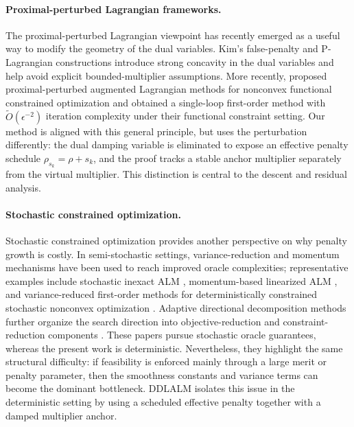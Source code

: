 \paragraph{Proximal-perturbed Lagrangian frameworks.}
The proximal-perturbed Lagrangian viewpoint has recently emerged as a useful
way to modify the geometry of the dual variables.  Kim's false-penalty and
P-Lagrangian constructions \citep{kimLagrangianBasedMethodFalse2023,
kimNewLagrangianbasedFirstorder2023} introduce strong concavity in the dual
variables and help avoid explicit bounded-multiplier assumptions.  More
recently, \citet{anonymous2026beyond} proposed proximal-perturbed augmented
Lagrangian methods for nonconvex functional constrained optimization and
obtained a single-loop first-order method with
$\widetilde O(\epsilon^{-2})$ iteration complexity under their functional
constraint setting.  Our method is aligned with this general principle, but
uses the perturbation differently: the dual damping variable is eliminated
to expose an effective penalty schedule $\rho_{s_k}=\rho+s_k$, and the proof
tracks a stable anchor multiplier separately from the virtual multiplier.
This distinction is central to the descent and residual analysis.

\paragraph{Stochastic constrained optimization.}
Stochastic constrained optimization provides another perspective on why
penalty growth is costly.  In semi-stochastic settings, variance-reduction and
momentum mechanisms have been used to reach improved oracle complexities;
representative examples include stochastic inexact ALM
\citep{li2024stochastic}, momentum-based linearized ALM
\citep{shi2025momentum}, and variance-reduced first-order methods for
deterministically constrained stochastic nonconvex optimization
\citep{lu2026variance}.  Adaptive directional decomposition methods further
organize the search direction into objective-reduction and
constraint-reduction components \citep{shi2025adaptive}.  These papers pursue
stochastic oracle guarantees, whereas the present work is deterministic.
Nevertheless, they highlight the same structural difficulty: if feasibility
is enforced mainly through a large merit or penalty parameter, then the
smoothness constants and variance terms can become the dominant bottleneck.
DDLALM isolates this issue in the deterministic setting by using a scheduled
effective penalty together with a damped multiplier anchor.

